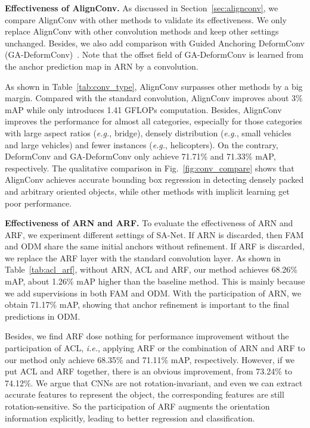 \documentclass[10pt,journal,final]{IEEEtran}
\def\eg{{\em e.g.}}
\def\ie{{\em i.e.}}
\begin{document}
{\bf Effectiveness of AlignConv.} As discussed in Section~\ref{sec:alignconv}, we compare AlignConv with other methods to validate its effectiveness. We only replace AlignConv with other convolution methods and keep other settings unchanged. Besides, we also add comparison with Guided Anchoring DeformConv (GA-DeformConv)~\cite{wang2019region}. Note that the offset field of GA-DeformConv is learned from the anchor prediction map in ARN by a  convolution. 

As shown in Table~\ref{tab:conv_type}, AlignConv surpasses other methods by a big margin. Compared with the standard convolution, AlignConv improves about 3\% mAP while only introduces 1.41 GFLOPs computation. Besides, AlignConv improves the performance for almost all categories, especially for those categories with large aspect ratios (\eg, bridge), densely distribution (\eg, small vehicles and large vehicles) and fewer instances (\eg, helicopters). On the contrary, DeformConv and GA-DeformConv only achieve 71.71\% and 71.33\% mAP, respectively. The qualitative comparison in Fig.~\ref{fig:conv_compare} shows that AlignConv achieves accurate bounding box regression in detecting densely packed and arbitrary oriented objects, while other methods with implicit learning get poor performance.

{\bf Effectiveness of ARN and ARF.} To evaluate the effectiveness of ARN and ARF, we experiment different settings of SA-Net. If ARN is discarded, then FAM and ODM share the same initial anchors without refinement. If ARF is discarded, we replace the ARF layer with the standard convolution layer. As shown in Table~\ref{tab:acl_arf}, without ARN, ACL and ARF, our method achieves 68.26\% mAP, about 1.26\% mAP higher than the baseline method. This is mainly because we add supervisions in both FAM and ODM. With the participation of ARN, we obtain 71.17\% mAP, showing that anchor refinement is important to the final predictions in ODM.

Besides, we find ARF dose nothing for performance improvement without the participation of ACL, \ie, applying ARF or the combination of ARN and ARF to our method only achieve 68.35\% and 71.11\% mAP, respectively.
However, if we put ACL and ARF together, there is an obvious improvement, from 73.24\% to 74.12\%. We argue that CNNs are not rotation-invariant, and even we can extract accurate features to represent the object, the corresponding features are still rotation-sensitive. So the participation of ARF augments the orientation information explicitly, leading to better regression and classification.
\end{document}
